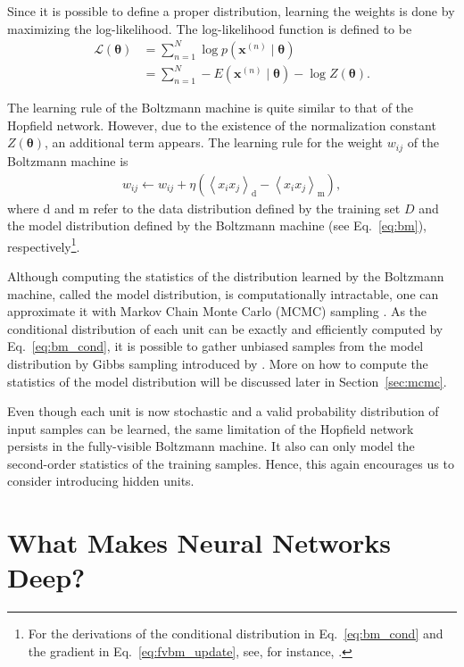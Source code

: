 \documentclass[dissertation,nocontribution,draft*]{aaltoseries}
\newcommand{\vect}[1]{\mathbf{#1}}
\newcommand{\vects}[1]{\boldsymbol{#1}}
\newcommand{\vx}[0]{\vect{x}}
\newcommand{\td}[0]{\text{d}}
\newcommand{\tf}[0]{\text{m}}
\newcommand{\TT}[0]{{\vects{\theta}}}
\newcommand{\LL}[0]{\mathcal{L}}
\begin{document}
Since it is possible to define a proper distribution,
learning the weights is done by maximizing the
log-likelihood. The log-likelihood function is defined to be
\begin{align}
    \label{eq:fvbm_ll}
    \LL(\TT) &= \sum_{n=1}^N \log p(\vx^{(n)} \mid \TT) 
    \nonumber
    \\
    &= \sum_{n=1}^N -E\left( \vx^{(n)} \mid \TT \right) -
    \log Z(\TT).
\end{align}

The learning rule of the Boltzmann machine is quite similar
to that of the Hopfield network. However, due to the
existence of the normalization constant $Z(\TT)$, an
additional term appears. The learning rule for the weight
$w_{ij}$ of the Boltzmann machine is
\begin{align}
    \label{eq:fvbm_update}
    w_{ij} \leftarrow w_{ij} + \eta \left( \left< x_i
    x_j\right>_\td - \left< x_i x_j \right>_\tf \right),
\end{align}
where $\td$ and $\tf$ refer to the data distribution defined
by the training set $D$ and the model distribution defined
by the Boltzmann machine (see Eq.~\eqref{eq:bm}),
respectively\footnote{
For the derivations of the conditional distribution in
Eq.~\eqref{eq:bm_cond} and the gradient in
Eq.~\eqref{eq:fvbm_update}, see, for instance,
\citep{Cho2011t}.
}.

Although computing the statistics of the distribution
learned by the Boltzmann machine, called the model distribution,
is computationally intractable, one can approximate it with
Markov Chain Monte Carlo (MCMC) sampling \citep[see,
e.g.,][]{Neal1993}.
As the conditional distribution of each unit can be exactly
and efficiently computed by Eq.~\eqref{eq:bm_cond}, it is
possible to gather unbiased samples from the model
distribution by Gibbs sampling introduced by
\citet{Geman1984}. More on how to compute the statistics of
the model distribution will be discussed later in
Section~\ref{sec:mcmc}.

Even though each unit is now stochastic and a
valid probability distribution of input samples can be
learned, the same limitation of the Hopfield network
persists in the fully-visible Boltzmann machine. It also can
only model the second-order statistics of the training
samples. Hence, this again encourages us to consider
introducing hidden units.

\section{What Makes Neural Networks Deep?}
\label{sec:deep_conditions}
\end{document}
